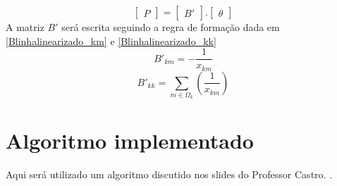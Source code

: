 \begin{equation}
    \left[ \begin{matrix} P \end{matrix} \right] =  \left[ \begin{matrix} B' \end{matrix} \right] .  \left[ \begin{matrix} \theta \end{matrix} \right]
    \label{Pk_linearizado_InjecaoLiquida_Matricial}
\end{equation}
A matriz $B'$ será escrita seguindo a regra de formação dada em \ref{Blinhalinearizado_km} e \ref{Blinhalinearizado_kk}
\begin{equation}
    B'_{km} = -\frac{1}{x_{km}}
    \label{Blinhalinearizado_km}
\end{equation}
\begin{equation}
    B'_{kk} = \sum_{m\in \Omega_k} \left(\frac{1}{x_{km}}\right)
    \label{Blinhalinearizado_kk}
\end{equation}

\section{Algoritmo implementado}

Aqui será utilizado um algoritmo discutido nos slides do Professor Castro. \cite{castro}.

